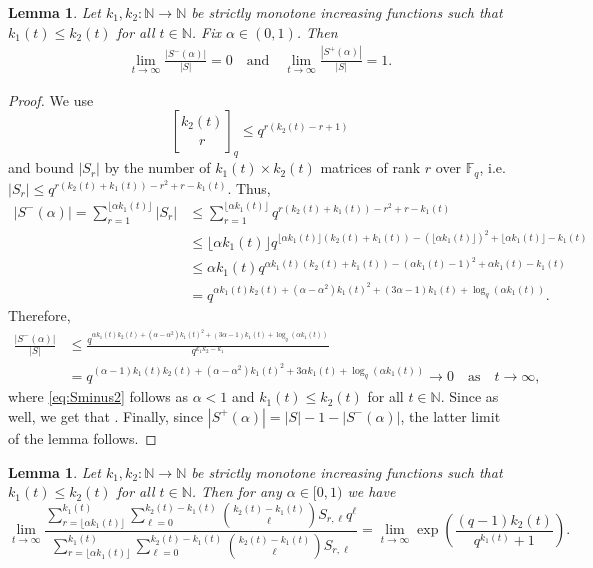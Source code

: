 \documentclass[a4paper,11pt,reqno]{article}
\newcommand{\qbinom}[2]{\genfrac[]{0pt}{0}{#1}{#2}}
\theoremstyle{plain} \numberwithin{equation}{section}
\newtheorem{Lemma}[theorem]{Lemma}
\theoremstyle{definition}
\begin{document}
\begin{Lemma}\label{lem:density}
Let $k_1,k_2\colon \mathbb{N}\rightarrow \mathbb{N}$ be strictly monotone increasing functions such that $k_1(t)\leq k_2(t)$ for all $t\in \mathbb{N}$.
Fix $\alpha\in(0,1)$. 
Then 
\begin{align*}
    \lim_{t\rightarrow \infty}\frac{|S^-(\alpha)|}{|S|} = 0 \quad \text{and} \quad \lim_{t\rightarrow \infty}\frac{|S^+(\alpha)|}{|S|} = 1.
\end{align*}
\end{Lemma}
\begin{proof}
We use
$$\qbinom{k_2(t)}{r}_q \le 
q^{r(k_2(t)-r+1)}$$ and bound $|S_r|$ by the number of $k_1(t)\times k_2(t)$ matrices of rank $r$ over $\mathbb{F}_q$, i.e. $|S_r| \leq q^{r(k_2(t)+k_1(t)) - r^2+r-k_1(t)}.$
Thus,
\begin{align*}
    |S^{-}(\alpha)| = \sum^{\lfloor \alpha k_1(t) \rfloor}_{r=1} |S_r|
    &\leq \sum^{\lfloor \alpha k_1(t) \rfloor}_{r=1} q^{r(k_2(t)+k_1(t))-r^2+r-k_1(t)}\\ 
    &\leq \lfloor \alpha k_1(t) \rfloor  q^{\lfloor \alpha k_1(t) \rfloor(k_2(t)+k_1(t))-(\lfloor \alpha k_1(t) \rfloor)^2+\lfloor \alpha k_1(t) \rfloor-k_1(t)}\\
    &\leq  \alpha k_1(t)  q^{\alpha k_1(t)(k_2(t)+k_1(t))-(\alpha k_1(t)-1)^2+\alpha k_1(t)-k_1(t)}\\
    &= q^{\alpha k_1(t) k_2(t) + (\alpha -\alpha^2)k_1(t)^2 + (3\alpha-1)k_1(t) + \log_q( \alpha k_1(t) ) }.
\end{align*}
Therefore,
\begin{align}
\frac{|S^-(\alpha)|}{|S|} &\leq \frac{q^{\alpha k_1(t) k_2(t) + (\alpha -\alpha^2)k_1(t)^2 + (3\alpha-1)k_1(t) + \log_q(\alpha k_1(t))}}{q^{k_1 k_2 -k_1}}  \nonumber \\
&= q^{(\alpha-1) k_1(t) k_2(t) + (\alpha -\alpha^2)k_1(t)^2 + 3\alpha k_1(t) + \log_q(\alpha k_1(t))} \rightarrow 0 \quad \text{as} \quad t\rightarrow \infty,\label{eq:Sminus2}
\end{align}
where \eqref{eq:Sminus2} follows as $\alpha<1$ and $k_1(t) \leq k_2(t)$ for all $t\in \mathbb{N}$. Since  as well, we get that . Finally, since  $|S^+(\alpha)| = |S|-1-|S^-(\alpha)|$, the latter limit of the lemma follows.
\end{proof}

\begin{Lemma}
Let $k_1,k_2\colon \mathbb{N}\rightarrow \mathbb{N}$ be strictly monotone increasing functions such that $k_1(t)\leq k_2(t)$ for all $t\in \mathbb{N}$.
Then for any $\alpha \in [0,1)$ we have
    $$\lim_{t \rightarrow \infty} \frac{\sum_{r=\lfloor\alpha k_1(t)\rfloor}^{k_1(t)} \sum_{\ell=0}^{k_2(t)-k_1(t)} \binom{k_2(t)-k_1(t)}{\ell}S_{r,\ell}q^{\ell}}{\sum_{r=\lfloor \alpha k_1(t) \rfloor}^{k_1(t)} \sum_{\ell=0}^{k_2(t)-k_1(t)} \binom{k_2(t)-k_1(t)}{\ell}S_{r,\ell}} = \lim_{t\rightarrow \infty} \exp \left( \frac{(q-1)k_2(t)}{q^{k_1(t)}+1}\right).
$$ \label{lem:weighteddensity}
\end{Lemma}
\end{document}
